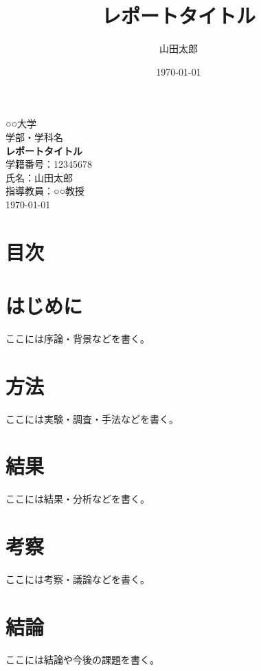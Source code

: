 \documentclass{report}
\title{レポートタイトル}
\author{山田太郎}
\date{\today}
\begin{document}
\renewcommand{\cftchapfont}{\normalfont}
\renewcommand{\cftchappagefont}{\normalfont}
\renewcommand{\cftchapleader}{\cftdotfill{\cftdotsep}}

\begin{titlepage}
  \begin{center}
    \vspace*{2cm}
    {\LARGE ○○大学\\[0.5cm] 学部・学科名}\\[3cm]
    {\Huge \bfseries レポートタイトル}\\[2cm]
    {\Large 学籍番号：12345678}\\[0.3cm]
    {\Large 氏名：山田太郎}\\[0.3cm]
    {\Large 指導教員：○○教授}\\[4cm]
    {\Large \today}
    \vfill
  \end{center}
\end{titlepage}

\chapter*{目次}
\tableofcontents
\vspace{1cm}
\newpage

\chapter{はじめに}
ここには序論・背景などを書く。

\chapter{方法}
ここには実験・調査・手法などを書く。

\chapter{結果}
ここには結果・分析などを書く。

\chapter{考察}
ここには考察・議論などを書く。

\chapter{結論}
ここには結論や今後の課題を書く。

\end{document}
